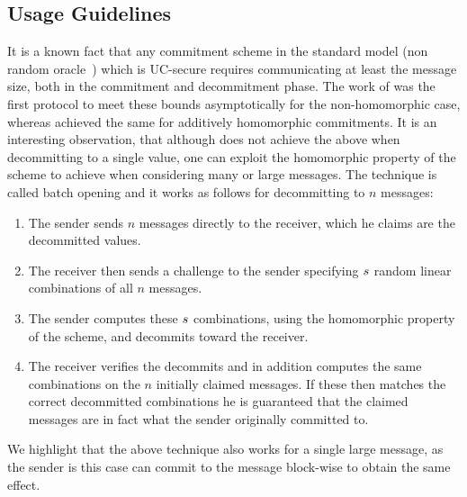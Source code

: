 
\subsection{Usage Guidelines}
It is a known fact that any commitment scheme in the standard model (non random oracle~\cite{DBLP:conf/ccs/BellareR93}) which is UC-secure \cite{DBLP:conf/focs/Canetti01} requires communicating at least the message size, both in the commitment and decommitment phase. The work of \cite{DBLP:conf/eurocrypt/GarayIKW14} was the first protocol to meet these bounds asymptotically for the non-homomorphic case, whereas \cite{DBLP:conf/tcc/FrederiksenJNT16} achieved the same for additively homomorphic commitments. It is an interesting observation, that although \cite{DBLP:conf/tcc/FrederiksenJNT16} does not achieve the above when decommitting to a single value, one can exploit the homomorphic property of the scheme to achieve when considering many or large messages. The technique is called batch opening and it works as follows for decommitting to $n$ messages:
\begin{enumerate}
  \item The sender sends $n$ messages directly to the receiver, which he claims are the decommitted values.
  \item The receiver then sends a challenge to the sender specifying $s$ random linear combinations of all $n$ messages.
  \item The sender computes these $s$ combinations, using the homomorphic property of the scheme, and decommits toward the receiver.
  \item The receiver verifies the decommits and in addition computes the same combinations on the $n$ initially claimed messages. If these then matches the correct decommitted combinations he is guaranteed that the claimed messages are in fact what the sender originally committed to.
\end{enumerate}

We highlight that the above technique also works for a single large message, as the sender is this case can commit to the message block-wise to obtain the same effect.

